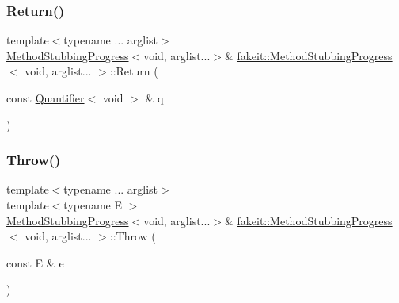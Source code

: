 \mbox{\label{structfakeit_1_1MethodStubbingProgress_3_01void_00_01arglist_8_8_8_01_4_afbc0d4429dddcbab63de1c88176ea0f1}} 
\subsubsection{\texorpdfstring{Return()}{Return()}\hspace{0.1cm}{\footnotesize\ttfamily [18/18]}}
{\footnotesize\ttfamily template$<$typename ... arglist$>$ \\
\mbox{\hyperlink{structfakeit_1_1MethodStubbingProgress}{Method\+Stubbing\+Progress}}$<$void, arglist...$>$\& \mbox{\hyperlink{structfakeit_1_1MethodStubbingProgress}{fakeit\+::\+Method\+Stubbing\+Progress}}$<$ void, arglist... $>$\+::Return (\begin{DoxyParamCaption}\item[{const \mbox{\hyperlink{structfakeit_1_1Quantifier}{Quantifier}}$<$ void $>$ \&}]{q }\end{DoxyParamCaption})\hspace{0.3cm}{\ttfamily [inline]}}

\mbox{\label{structfakeit_1_1MethodStubbingProgress_3_01void_00_01arglist_8_8_8_01_4_a8b0d920dc6424eadd7dce7cb9df66814}} 
\subsubsection{\texorpdfstring{Throw()}{Throw()}\hspace{0.1cm}{\footnotesize\ttfamily [1/27]}}
{\footnotesize\ttfamily template$<$typename ... arglist$>$ \\
template$<$typename E $>$ \\
\mbox{\hyperlink{structfakeit_1_1MethodStubbingProgress}{Method\+Stubbing\+Progress}}$<$void, arglist...$>$\& \mbox{\hyperlink{structfakeit_1_1MethodStubbingProgress}{fakeit\+::\+Method\+Stubbing\+Progress}}$<$ void, arglist... $>$\+::Throw (\begin{DoxyParamCaption}\item[{const E \&}]{e }\end{DoxyParamCaption})\hspace{0.3cm}{\ttfamily [inline]}}

